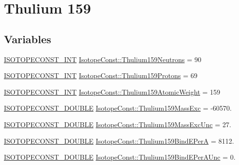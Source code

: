 \hypertarget{group___isotope_const-_thulium-_tm159}{}\section{Thulium 159}
\label{group___isotope_const-_thulium-_tm159}
\subsection*{Variables}
\begin{DoxyCompactItemize}
\item 
\mbox{\hyperlink{group___isotope_const-_macros_ga5f18360b3e99483a35c32d789e62621c}{I\+S\+O\+T\+O\+P\+E\+C\+O\+N\+S\+T\+\_\+\+I\+NT}} \mbox{\hyperlink{group___isotope_const-_thulium-_tm159_ga5a1469f02709988f9b11b872daa8f2e6}{Isotope\+Const\+::\+Thulium159\+Neutrons}} = 90
\item 
\mbox{\hyperlink{group___isotope_const-_macros_ga5f18360b3e99483a35c32d789e62621c}{I\+S\+O\+T\+O\+P\+E\+C\+O\+N\+S\+T\+\_\+\+I\+NT}} \mbox{\hyperlink{group___isotope_const-_thulium-_tm159_ga4f837aa891fc42bef174fb736b0c6438}{Isotope\+Const\+::\+Thulium159\+Protons}} = 69
\item 
\mbox{\hyperlink{group___isotope_const-_macros_ga5f18360b3e99483a35c32d789e62621c}{I\+S\+O\+T\+O\+P\+E\+C\+O\+N\+S\+T\+\_\+\+I\+NT}} \mbox{\hyperlink{group___isotope_const-_thulium-_tm159_ga66c95f5d09ec0944936a9a97a312cea8}{Isotope\+Const\+::\+Thulium159\+Atomic\+Weight}} = 159
\item 
\mbox{\hyperlink{group___isotope_const-_macros_ga8f45a7272ce02c0b4c65c44636ed719a}{I\+S\+O\+T\+O\+P\+E\+C\+O\+N\+S\+T\+\_\+\+D\+O\+U\+B\+LE}} \mbox{\hyperlink{group___isotope_const-_thulium-_tm159_ga596f5bed38df5ea7aaa0f64f402c1ef7}{Isotope\+Const\+::\+Thulium159\+Mass\+Exc}} = -\/60570.
\item 
\mbox{\hyperlink{group___isotope_const-_macros_ga8f45a7272ce02c0b4c65c44636ed719a}{I\+S\+O\+T\+O\+P\+E\+C\+O\+N\+S\+T\+\_\+\+D\+O\+U\+B\+LE}} \mbox{\hyperlink{group___isotope_const-_thulium-_tm159_gab3393897b8b2bec63fad7d4a5abdc4e6}{Isotope\+Const\+::\+Thulium159\+Mass\+Exc\+Unc}} = 27.
\item 
\mbox{\hyperlink{group___isotope_const-_macros_ga8f45a7272ce02c0b4c65c44636ed719a}{I\+S\+O\+T\+O\+P\+E\+C\+O\+N\+S\+T\+\_\+\+D\+O\+U\+B\+LE}} \mbox{\hyperlink{group___isotope_const-_thulium-_tm159_gae095a1b2c36952a678dc69044ee07cf6}{Isotope\+Const\+::\+Thulium159\+Bind\+E\+PerA}} = 8112.
\item 
\mbox{\hyperlink{group___isotope_const-_macros_ga8f45a7272ce02c0b4c65c44636ed719a}{I\+S\+O\+T\+O\+P\+E\+C\+O\+N\+S\+T\+\_\+\+D\+O\+U\+B\+LE}} \mbox{\hyperlink{group___isotope_const-_thulium-_tm159_ga002e3e5fb1b2b066ca5bc0592c76ba13}{Isotope\+Const\+::\+Thulium159\+Bind\+E\+Per\+A\+Unc}} = 0.

\end{DoxyCompactItemize}
